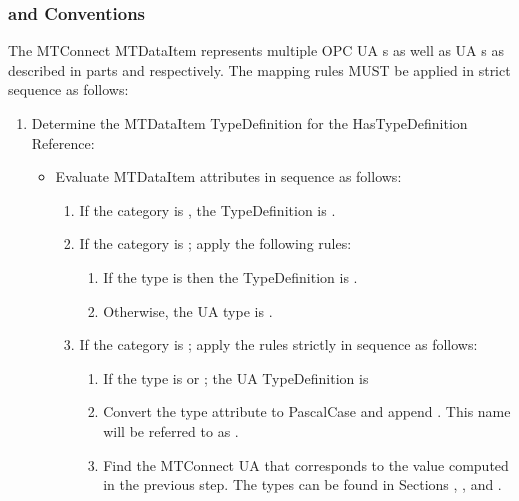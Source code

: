 \subsubsection{  and  Conventions}
\label{sec:data-item-conventions}

The MTConnect \gls{MTDataItem} represents multiple OPC UA s as well as UA s as described in parts \cite{UAPart8} and \cite{UAPart9} respectively. The mapping rules MUST be applied in strict sequence as follows:

\begin{enumerate}
  \item Determine the \gls{MTDataItem} \gls{TypeDefinition} for the \gls{HasTypeDefinition} \gls{Reference}:
  \begin{itemize}
    \item Evaluate \gls{MTDataItem} attributes in sequence as follows:
    \begin{enumerate}
      \setlength\itemsep{1em}
      \item If the \gls{category} is , the \gls{TypeDefinition} is .
      
      \item If the \gls{category} is ; apply the following rules:
      \begin{enumerate}
        \item If the \gls{type} is  then the \gls{TypeDefinition} is .
        \item Otherwise, the UA type is .
      \end{enumerate}
      
      \item If the \gls{category} is ; apply the rules strictly in sequence as follows:
      \begin{enumerate}
        \setlength\itemsep{1em}
        \item If the \gls{type} is  or ; the UA \gls{TypeDefinition} is 
        
        \item Convert the \gls{type} attribute to \gls{PascalCase} and append . This name will be referred to as .
        
        \item Find the MTConnect UA  that corresponds to the value computed in the previous step.
        The types can be found in Sections , , and .
        

\end{enumerate}
\end{enumerate}
\end{itemize}
\end{enumerate}
